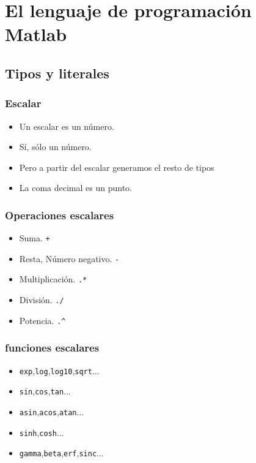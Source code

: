 \documentclass[12pt]{beamer}
\begin{document}
\section{El lenguaje de programación Matlab}
\subsection{Tipos y literales}

\begin{frame}
  \frametitle{Escalar}
  \begin{itemize}
  \item Un escalar es un número.
    \pause
  \item Sí, sólo un número.
  \item Pero a partir del escalar generamos el resto de tipos
  \item La coma decimal es un punto.
  \end{itemize}
  \testcode
\end{frame}

\begin{frame}
  \frametitle{Operaciones escalares}
  \begin{itemize}
  \item Suma. \texttt{+}
  \item Resta, Número negativo. \texttt{-}
  \item Multiplicación. \texttt{.*}
  \item División. \texttt{./}
  \item Potencia. \texttt{.\^}
  \end{itemize}
\end{frame}

\begin{frame}
  \frametitle{funciones escalares}
  \begin{itemize}
  \item \texttt{exp},\texttt{log},\texttt{log10},\texttt{sqrt}...
  \item \texttt{sin},\texttt{cos},\texttt{tan}...
  \item \texttt{asin},\texttt{acos},\texttt{atan}...
  \item \texttt{sinh},\texttt{cosh}...
  \item \texttt{gamma},\texttt{beta},\texttt{erf},\texttt{sinc}...
  \end{itemize}
\end{frame}
\end{document}
